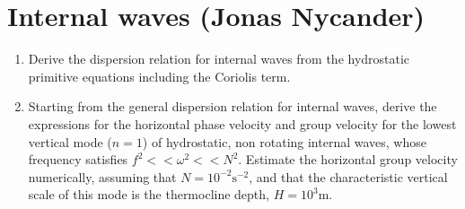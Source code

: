 \documentclass[a4paper,11pt]{article}
\begin{document}
\section{Internal waves (Jonas Nycander)} 
\begin{enumerate}
\item Derive the dispersion relation for internal waves from the hydrostatic primitive equations including the Coriolis term.
\item Starting from the general dispersion relation for internal waves, derive the expressions for the horizontal phase velocity and group velocity for the lowest vertical mode ($n = 1$) of hydrostatic, non rotating internal waves, whose frequency satisfies $f^{2} << \omega^{2} << N^{2}$. 
Estimate the horizontal group velocity numerically, assuming that $N = 10^{-2} \text{s}^{-2}$, and that the characteristic vertical scale of this mode is the thermocline depth, $H = 10^{3}$m.
\end{enumerate}
\end{document}

